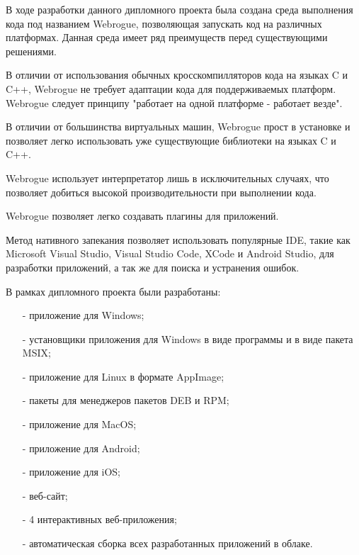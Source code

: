 В ходе разработки данного дипломного проекта была создана среда выполнения кода под названием Webrogue, позволяющая запускать код на различных платформах.
Данная среда имеет ряд преимуществ перед существующими решениями.

В отличии от использования обычных кросскомпилляторов кода на языках C и C++, Webrogue не требует адаптации кода для поддерживаемых платформ. 
Webrogue следует принципу "работает на одной платформе - работает везде".

В отличии от большинства виртуальных машин, Webrogue прост в установке и позволяет легко использовать уже существующие библиотеки на языках C и C++.

Webrogue использует интерпретатор лишь в исключительных случаях, что позволяет добиться высокой производительности при выполнении кода.

Webrogue позволяет легко создавать плагины для приложений.

Метод нативного запекания позволяет использовать популярные IDE, такие как Microsoft Visual Studio, Visual Studio Code, XCode и Android Studio, для разработки приложений, а так же для поиска и устранения ошибок.

В рамках дипломного проекта были разработаны:
\begin{itemize}
    \item[-] приложение для Windows;
    \item[-] установщики приложения для Windows в виде программы и в виде пакета MSIX;
    \item[-] приложение для Linux в формате AppImage;
    \item[-] пакеты для менеджеров пакетов DEB и RPM;
    \item[-] приложение для MacOS;
    \item[-] приложение для Android;
    \item[-] приложение для iOS;
    \item[-] веб-сайт;
    \item[-] 4 интерактивных веб-приложения;
    \item[-] автоматическая сборка всех разработанных приложений в облаке.
\end{itemize}

